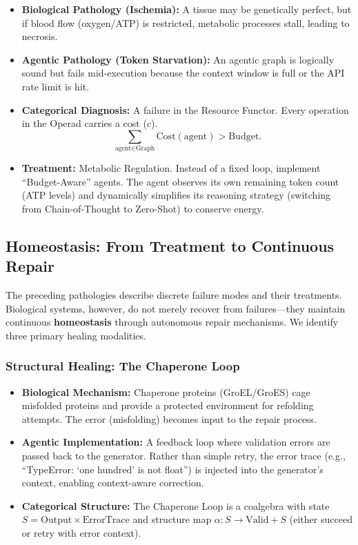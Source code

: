 \begin{itemize}[leftmargin=*]
\item \textbf{Biological Pathology (Ischemia):} A tissue may be genetically perfect, but if blood flow
(oxygen/ATP) is restricted, metabolic processes stall, leading to necrosis.
\item \textbf{Agentic Pathology (Token Starvation):} An agentic graph is logically sound but fails mid-execution
because the context window is full or the API rate limit is hit.
\item \textbf{Categorical Diagnosis:} A failure in the Resource Functor. Every operation in the Operad carries a
cost ($c$).
\begin{equation}
\sum_{\text{agent}\in \text{Graph}} \mathrm{Cost}(\text{agent}) > \mathrm{Budget}.
\label{eq:budget-overflow}
\end{equation}
\item \textbf{Treatment:} Metabolic Regulation. Instead of a fixed loop, implement ``Budget-Aware'' agents. The
agent observes its own remaining token count (ATP levels) and dynamically simplifies its reasoning strategy
(switching from Chain-of-Thought to Zero-Shot) to conserve energy.
\end{itemize}

\subsection{Homeostasis: From Treatment to Continuous Repair}

The preceding pathologies describe discrete failure modes and their treatments. Biological systems,
however, do not merely recover from failures---they maintain continuous \textbf{homeostasis} through
autonomous repair mechanisms. We identify three primary healing modalities.

\subsubsection{Structural Healing: The Chaperone Loop}

\begin{itemize}[leftmargin=*]
\item \textbf{Biological Mechanism:} Chaperone proteins (GroEL/GroES) cage misfolded proteins and
provide a protected environment for refolding attempts. The error (misfolding) becomes input to the
repair process.
\item \textbf{Agentic Implementation:} A feedback loop where validation errors are passed back to
the generator. Rather than simple retry, the error trace (e.g., ``TypeError: `one hundred' is not float'')
is injected into the generator's context, enabling context-aware correction.
\item \textbf{Categorical Structure:} The Chaperone Loop is a coalgebra with state
$S = \text{Output} \times \text{ErrorTrace}$ and structure map
$\alpha: S \to \text{Valid} + S$ (either succeed or retry with error context).
\end{itemize}

